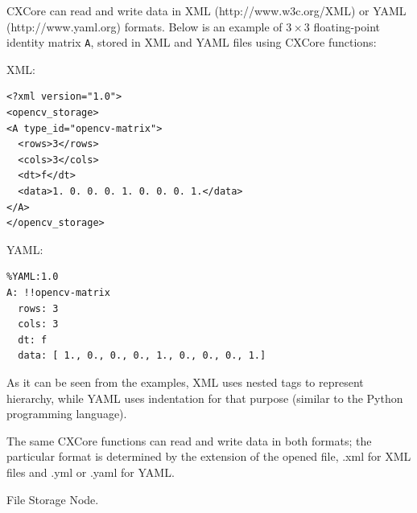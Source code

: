 CXCore can read and write data in XML (http://www.w3c.org/XML) or YAML
(http://www.yaml.org) formats. Below is an example of $3 \times 3$
floating-point identity matrix \texttt{A}, stored in XML and YAML files
using CXCore functions:

XML:

\begin{verbatim}
<?xml version="1.0">
<opencv_storage>
<A type_id="opencv-matrix">
  <rows>3</rows>
  <cols>3</cols>
  <dt>f</dt>
  <data>1. 0. 0. 0. 1. 0. 0. 0. 1.</data>
</A>
</opencv_storage>
\end{verbatim}

YAML:

\begin{verbatim}
%YAML:1.0
A: !!opencv-matrix
  rows: 3
  cols: 3
  dt: f
  data: [ 1., 0., 0., 0., 1., 0., 0., 0., 1.]
\end{verbatim}

As it can be seen from the examples, XML uses nested tags to represent
hierarchy, while YAML uses indentation for that purpose (similar
to the Python programming language).

The same CXCore functions can read and write data in both formats;
the particular format is determined by the extension of the opened
file, .xml for XML files and .yml or .yaml for YAML.


\label{CvFileNode}

File Storage Node.

